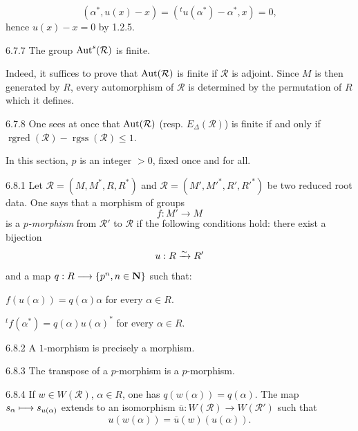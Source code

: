 \[
(\alpha^*,u(x)-x)=({}^tu(\alpha^*)-\alpha^*,x)=0,
\]
hence $u(x)-x=0$ by 1.2.5.
\begin{lemma}{6.7.7}\label{XXI.6.7.7}
The group $\operatorname{Aut}^s(\mathcal R)$ is finite.
\end{lemma}
Indeed, it suffices to prove that $\operatorname{Aut}(\mathcal R)$ is finite if $\mathcal R$ is adjoint. Since $M$ is then generated by $R$, every automorphism of $\mathcal R$ is determined by the permutation of $R$ which it defines.
\begin{remark}{6.7.8}\label{XXI.6.7.8}
One sees at once that $\operatorname{Aut}(\mathcal R)$ (resp. $E_\Delta(\mathcal R)$) is finite if and only if $\operatorname{rgred}(\mathcal R)-\operatorname{rgss}(\mathcal R)\leq1$.
\end{remark}

In this section, $p$ is an integer $>0$, fixed once and for all.
\begin{definition}{6.8.1}\label{XXI.6.8.1}
Let $\mathcal R=(M,M^*,R,R^*)$ and $\mathcal R=(M',M'^*,R',R'^*)$ be two reduced root data. One says that a morphism of groups
\[
f:M'\to M
\]
is a \emph{$p$-morphism} from $\mathcal R'$ to $\mathcal R$ if the following conditions hold: there exist a bijection
\[
u:R\xrightarrow{\sim} R'
\]
and a map $q:R\longrightarrow\{p^n,n\in\mathbf{N}\}$ such that:
\begin{enumeratei}
\item $f(u(\alpha))=q(\alpha)\alpha$ for every $\alpha\in R$.
\item ${}^tf(\alpha^*)=q(\alpha)u(\alpha)^*$ for every $\alpha\in R$.{\renewcommand{\thefootnote}{(29)}}
\end{enumeratei}
\end{definition}
\begin{corollary}{6.8.2}\label{XXI.6.8.2}
A $1$-morphism is precisely a morphism.
\end{corollary}
\begin{corollary}{6.8.3}\label{XXI.6.8.3}
The transpose of a $p$-morphism is a $p$-morphism.
\end{corollary}
\begin{lemma}{6.8.4}\label{XXI.6.8.4}
If $w\in W(\mathcal R)$, $\alpha\in R$, one has $q(w(\alpha))=q(\alpha)$. The map $s_\alpha\longmapsto s_{u(\alpha)}$ extends to an isomorphism $\overline u:W(\mathcal R)\to W(\mathcal R')$ such that
\[
u(w(\alpha))=\overline u(w)(u(\alpha)).
\]
\end{lemma}
